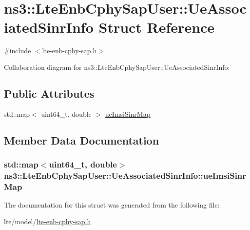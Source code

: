 \hypertarget{structns3_1_1LteEnbCphySapUser_1_1UeAssociatedSinrInfo}{}\section{ns3\+:\+:Lte\+Enb\+Cphy\+Sap\+User\+:\+:Ue\+Associated\+Sinr\+Info Struct Reference}
\label{structns3_1_1LteEnbCphySapUser_1_1UeAssociatedSinrInfo}


{\ttfamily \#include $<$lte-\/enb-\/cphy-\/sap.\+h$>$}



Collaboration diagram for ns3\+:\+:Lte\+Enb\+Cphy\+Sap\+User\+:\+:Ue\+Associated\+Sinr\+Info\+:
\subsection*{Public Attributes}
\begin{DoxyCompactItemize}
\item 
std\+::map$<$ uint64\+\_\+t, double $>$ \hyperlink{structns3_1_1LteEnbCphySapUser_1_1UeAssociatedSinrInfo_a011af8775e1a2e4c65505a9bbdb55d15}{ue\+Imsi\+Sinr\+Map}
\end{DoxyCompactItemize}


\subsection{Member Data Documentation}
\subsubsection[{\texorpdfstring{ue\+Imsi\+Sinr\+Map}{ueImsiSinrMap}}]{\setlength{\rightskip}{0pt plus 5cm}std\+::map$<$uint64\+\_\+t, double$>$ ns3\+::\+Lte\+Enb\+Cphy\+Sap\+User\+::\+Ue\+Associated\+Sinr\+Info\+::ue\+Imsi\+Sinr\+Map}\hypertarget{structns3_1_1LteEnbCphySapUser_1_1UeAssociatedSinrInfo_a011af8775e1a2e4c65505a9bbdb55d15}{}\label{structns3_1_1LteEnbCphySapUser_1_1UeAssociatedSinrInfo_a011af8775e1a2e4c65505a9bbdb55d15}


The documentation for this struct was generated from the following file\+:\begin{DoxyCompactItemize}
\item 
lte/model/\hyperlink{lte-enb-cphy-sap_8h}{lte-\/enb-\/cphy-\/sap.\+h}\end{DoxyCompactItemize}
